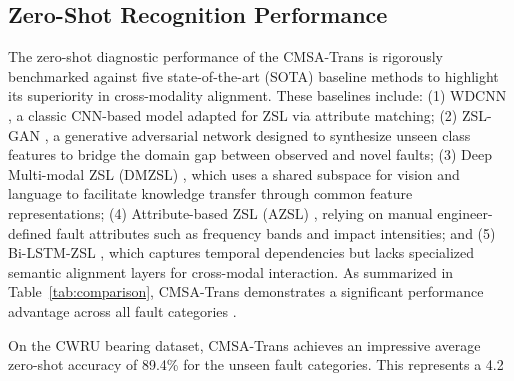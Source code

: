 \documentclass[journal]{IEEEtran}
\begin{document}
\subsection{Zero-Shot Recognition Performance}
The zero-shot diagnostic performance of the CMSA-Trans is rigorously benchmarked against five state-of-the-art (SOTA) baseline methods to highlight its superiority in cross-modality alignment. These baselines include: (1) WDCNN \cite{zhang2017new}, a classic CNN-based model adapted for ZSL via attribute matching; (2) ZSL-GAN \cite{xian2019fvaegan}, a generative adversarial network designed to synthesize unseen class features to bridge the domain gap between observed and novel faults; (3) Deep Multi-modal ZSL (DMZSL) \cite{schonfeld2019generalized}, which uses a shared subspace for vision and language to facilitate knowledge transfer through common feature representations; (4) Attribute-based ZSL (AZSL) \cite{lampert2014attribute}, relying on manual engineer-defined fault attributes such as frequency bands and impact intensities; and (5) Bi-LSTM-ZSL \cite{chen2019bearing}, which captures temporal dependencies but lacks specialized semantic alignment layers for cross-modal interaction. As summarized in Table~\ref{tab:comparison}, CMSA-Trans demonstrates a significant performance advantage across all fault categories \cite{li2022zero, lu2017deep}.

On the CWRU bearing dataset, CMSA-Trans achieves an impressive average zero-shot accuracy of 89.4\% for the unseen fault categories. This represents a 4.2%
\end{document}

